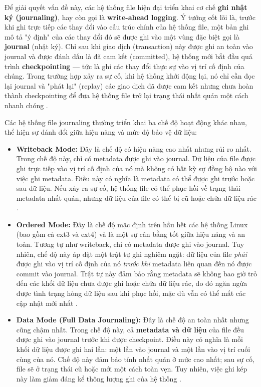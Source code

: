 \documentclass[12pt]{article}
\begin{document}
Để giải quyết vấn đề này, các hệ thống file hiện đại triển khai cơ chế \textbf{ghi nhật ký (journaling)}, hay còn gọi là \textbf{write-ahead logging}. Ý tưởng cốt lõi là, trước khi ghi trực tiếp các thay đổi vào cấu trúc chính của hệ thống file, một bản ghi mô tả "ý định" của các thay đổi đó sẽ được ghi vào một vùng đặc biệt gọi là \textbf{journal} (nhật ký). Chỉ sau khi giao dịch (transaction) này được ghi an toàn vào journal và được đánh dấu là đã cam kết (committed), hệ thống mới bắt đầu quá trình \textbf{checkpointing} --- tức là ghi các thay đổi thực sự vào vị trí cố định của chúng. Trong trường hợp xảy ra sự cố, khi hệ thống khởi động lại, nó chỉ cần đọc lại journal và "phát lại" (replay) các giao dịch đã được cam kết nhưng chưa hoàn thành checkpointing để đưa hệ thống file trở lại trạng thái nhất quán một cách nhanh chóng \parencite{Prabhakaran2005journaling, Jones2008Anatomy}.

Các hệ thống file journaling thường triển khai ba chế độ hoạt động khác nhau, thể hiện sự đánh đổi giữa hiệu năng và mức độ bảo vệ dữ liệu:
\begin{itemize}
    \item \textbf{Writeback Mode:} Đây là chế độ có hiệu năng cao nhất nhưng rủi ro nhất. Trong chế độ này, chỉ có metadata được ghi vào journal. Dữ liệu của file được ghi trực tiếp vào vị trí cố định của nó mà không có bất kỳ sự đồng bộ nào với việc ghi metadata. Điều này có nghĩa là metadata có thể được ghi trước hoặc sau dữ liệu. Nếu xảy ra sự cố, hệ thống file có thể phục hồi về trạng thái metadata nhất quán, nhưng dữ liệu của file có thể bị cũ hoặc chứa dữ liệu rác \parencite{Jones2008Anatomy}.

    \item \textbf{Ordered Mode:} Đây là chế độ mặc định trên hầu hết các hệ thống Linux (bao gồm cả ext3 và ext4) và là một sự cân bằng tốt giữa hiệu năng và an toàn. Tương tự như writeback, chỉ có metadata được ghi vào journal. Tuy nhiên, chế độ này áp đặt một trật tự ghi nghiêm ngặt: dữ liệu của file \textit{phải} được ghi vào vị trí cố định của nó \textit{trước khi} metadata liên quan đến nó được commit vào journal. Trật tự này đảm bảo rằng metadata sẽ không bao giờ trỏ đến các khối dữ liệu chưa được ghi hoặc chứa dữ liệu rác, do đó ngăn ngừa được tình trạng hỏng dữ liệu sau khi phục hồi, mặc dù vẫn có thể mất các cập nhật mới nhất \parencite{Prabhakaran2005journaling}.

    \item \textbf{Data Mode (Full Data Journaling):} Đây là chế độ an toàn nhất nhưng cũng chậm nhất. Trong chế độ này, cả \textbf{metadata và dữ liệu} của file đều được ghi vào journal trước khi được checkpoint. Điều này có nghĩa là mỗi khối dữ liệu được ghi hai lần: một lần vào journal và một lần vào vị trí cuối cùng của nó. Chế độ này đảm bảo tính nhất quán ở mức cao nhất; sau sự cố, file sẽ ở trạng thái cũ hoặc mới một cách toàn vẹn. Tuy nhiên, việc ghi kép này làm giảm đáng kể thông lượng ghi của hệ thống \parencite{Jones2008Anatomy}.
\end{itemize}
\end{document}
